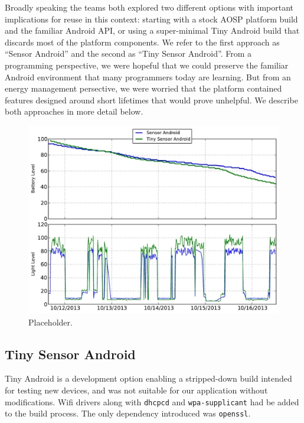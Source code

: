 Broadly speaking the teams both explored two different options with important
implications for reuse in this context: starting with a stock AOSP platform
build and the familiar Android API, or using a super-minimal Tiny Android
build that discards most of the platform components. We refer to the first
approach as ``Sensor Android'' and the second as ``Tiny Sensor Android''.
From a programming perspective, we were hopeful that we could preserve the
familiar Android environment that many programmers today are learning. But
from an energy management persective, we were worried that the platform
contained features designed around short lifetimes that would prove
unhelpful. We describe both approaches in more detail below.

\begin{figure}[t]
\includegraphics[width=\columnwidth]{./figures/comparison.pdf}

\caption{\small Placeholder.}

\label{fig-tinyvfull}
\end{figure}

\subsection{Tiny Sensor Android}
\label{subsec-tiny}

Tiny Android is a development option enabling a stripped-down build intended
for testing new devices, and was not suitable for our application without
modifications. Wifi drivers along with \texttt{dhcpcd} and
\texttt{wpa-supplicant} had be added to the build process. The only
dependency introduced was \texttt{openssl}. 

